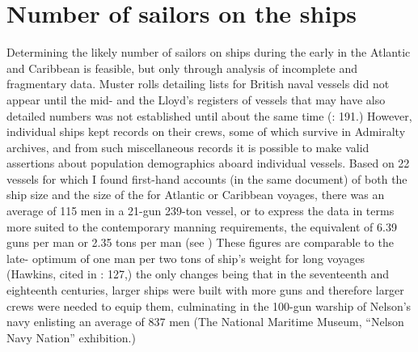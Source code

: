 \section{{Number of sailors on the ships}}\label{sec:3.12}

  Determining the likely number of sailors on ships during the early  in the Atlantic and Caribbean is feasible, but only through analysis of incomplete and fragmentary data. Muster rolls detailing  lists for British naval vessels did not appear until the mid- \citep[125]{Litter1999} and the Lloyd’s registers of vessels that may have also detailed  numbers was not established until about the same time (\citealt{Litter1999}: 191.) However, individual ships kept records on their crews, some of which survive in Admiralty archives, and from such miscellaneous records it is possible to make valid assertions about population demographics aboard individual vessels. Based on 22 vessels for which I found first-hand accounts (in the same document) of both the ship size and the size of the  for Atlantic or Caribbean voyages, there was an average of 115 men in a 21-gun 239-ton vessel, or to express the data in terms more suited to the contemporary manning requirements, the equivalent of 6.39 guns per man or 2.35 tons per man (see ) These figures are comparable to the late- optimum of one man per two tons of ship’s weight for long voyages (Hawkins, cited in \citealt{Bicheno2012}: 127,) the only changes being that in the seventeenth and eighteenth centuries, larger ships were built with more guns and therefore larger crews were needed to equip them, culminating in the 100-gun warship of Nelson’s navy enlisting an average of 837 men (The National Maritime Museum, “Nelson Navy Nation” exhibition.)


